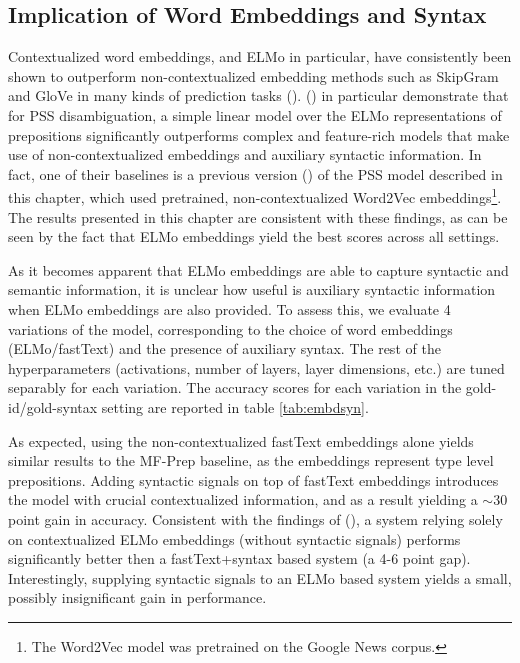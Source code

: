 \subsection{Implication of Word Embeddings and Syntax}

Contextualized word embeddings, and ELMo in particular, have consistently been shown to outperform non-contextualized embedding methods such as SkipGram and GloVe in many kinds of prediction tasks (\cite{elmo, nelson}). (\cite{nelson}) in particular demonstrate that for PSS disambiguation, a simple linear model over the ELMo representations of prepositions significantly outperforms complex and feature-rich models that make use of non-contextualized embeddings and auxiliary syntactic information. In fact, one of their baselines is a previous version (\cite{snacs}) of the PSS model described in this chapter, which used pretrained, non-contextualized  Word2Vec  embeddings\footnote{The Word2Vec model was pretrained on the Google News corpus.}. The results presented in this chapter are consistent with these findings, as can be seen by the fact that ELMo embeddings yield the best scores across all settings.

As it becomes apparent that ELMo embeddings are able to capture syntactic and semantic information, it is unclear how useful is auxiliary syntactic information when ELMo embeddings are also provided. To assess this, we evaluate 4 variations of the model, corresponding to the choice of word embeddings (ELMo/fastText) and the presence of auxiliary syntax. The rest of the hyperparameters (activations, number of layers, layer dimensions, etc.) are tuned separably for each variation. The accuracy scores for each variation in the gold-id/gold-syntax setting are reported in table \ref{tab:embdsyn}.

As expected, using the non-contextualized fastText embeddings alone yields similar results to the MF-Prep baseline, as the embeddings represent type level prepositions. Adding syntactic signals on top of fastText embeddings introduces the model with crucial contextualized information, and as a result yielding a $\sim$30 point gain in accuracy. Consistent with the findings of (\cite{nelson}), a system relying solely on contextualized ELMo embeddings (without syntactic signals) performs significantly better then a fastText+syntax based system (a 4-6 point gap). Interestingly, supplying syntactic signals to an ELMo based system yields a small, possibly insignificant gain in performance. 


